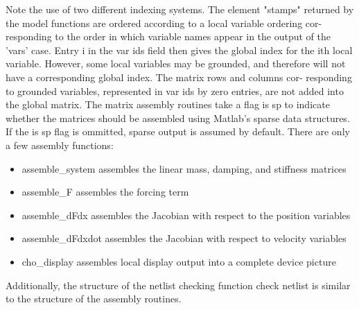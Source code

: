 Note the use of two different indexing systems. The element "stamps" returned
by the model functions are ordered according to a local variable ordering cor-
responding to the order in which variable names appear in the output of the
'vars' case. Entry i in the var ids field then gives the global index for the ith
local variable. However, some local variables may be grounded, and therefore
will not have a corresponding global index. The matrix rows and columns cor-
responding to grounded variables, represented in var ids by zero entries, are
not added into the global matrix.
   The matrix assembly routines take a flag is sp to indicate whether the
matrices should be assembled using Matlab's sparse data structures. If the
is sp flag is ommitted, sparse output is assumed by default.
   There are only a few assembly functions:
\begin{itemize}
\item{assemble\_system} assembles the linear mass, damping, and stiffness matrices

\item{assemble\_F} assembles the forcing term

\item{assemble\_dFdx} assembles the Jacobian with respect to the position variables

\item{assemble\_dFdxdot} assembles the Jacobian with respect to velocity variables

\item{cho\_display} assembles local display output into a complete device picture

\end{itemize}

   Additionally, the structure of the netlist checking function check netlist
is similar to the structure of the assembly routines.


